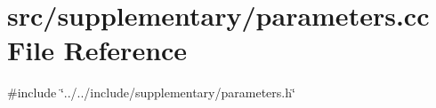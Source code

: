 \section{src/supplementary/parameters.cc File Reference}
\label{parameters_8cc}
{\ttfamily \#include \char`\"{}../../include/supplementary/parameters.\+h\char`\"{}}\newline

